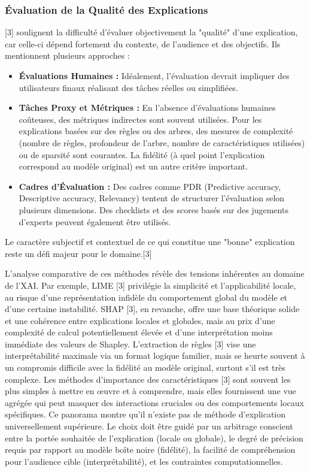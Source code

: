 \documentclass[11pt,a4paper]{article}
\begin{document}
\subsubsection{Évaluation de la Qualité des Explications}
\citet{Burkart2021} [3] soulignent la difficulté d'évaluer objectivement la "qualité" d'une explication, car celle-ci dépend fortement du contexte, de l'audience et des objectifs. Ils mentionnent plusieurs approches :
\begin{itemize}
    \item \textbf{Évaluations Humaines :} Idéalement, l'évaluation devrait impliquer des utilisateurs finaux réalisant des tâches réelles ou simplifiées.
    \item \textbf{Tâches Proxy et Métriques :} En l'absence d'évaluations humaines coûteuses, des métriques indirectes sont souvent utilisées. Pour les explications basées sur des règles ou des arbres, des mesures de complexité (nombre de règles, profondeur de l'arbre, nombre de caractéristiques utilisées) ou de sparsité sont courantes. La fidélité (à quel point l'explication correspond au modèle original) est un autre critère important.
    \item \textbf{Cadres d'Évaluation :} Des cadres comme PDR (Predictive accuracy, Descriptive accuracy, Relevancy) tentent de structurer l'évaluation selon plusieurs dimensions. Des checklists et des scores basés sur des jugements d'experts peuvent également être utilisés.
\end{itemize}
Le caractère subjectif et contextuel de ce qui constitue une "bonne" explication reste un défi majeur pour le domaine.[3]

L'analyse comparative de ces méthodes révèle des tensions inhérentes au domaine de l'XAI. Par exemple, LIME [3] privilégie la simplicité et l'applicabilité locale, au risque d'une représentation infidèle du comportement global du modèle et d'une certaine instabilité. SHAP [3], en revanche, offre une base théorique solide et une cohérence entre explications locales et globales, mais au prix d'une complexité de calcul potentiellement élevée et d'une interprétation moins immédiate des valeurs de Shapley. L'extraction de règles [3] vise une interprétabilité maximale via un format logique familier, mais se heurte souvent à un compromis difficile avec la fidélité au modèle original, surtout s'il est très complexe. Les méthodes d'importance des caractéristiques [3] sont souvent les plus simples à mettre en œuvre et à comprendre, mais elles fournissent une vue agrégée qui peut masquer des interactions cruciales ou des comportements locaux spécifiques. Ce panorama montre qu'il n'existe pas de méthode d'explication universellement supérieure. Le choix doit être guidé par un arbitrage conscient entre la portée souhaitée de l'explication (locale ou globale), le degré de précision requis par rapport au modèle boîte noire (fidélité), la facilité de compréhension pour l'audience cible (interprétabilité), et les contraintes computationnelles.
\end{document}
